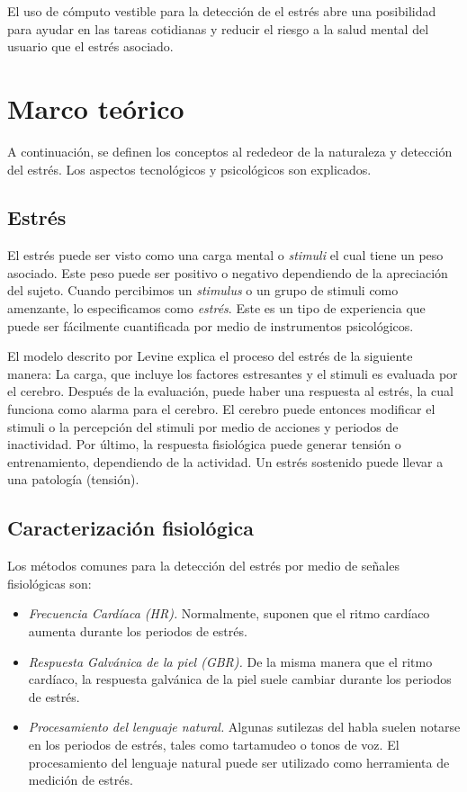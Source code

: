 \documentclass[letterpaper,12pt]{cicese}
\begin{document}
			El uso de c\'omputo vestible para la detecci\'on de el estr\'es abre una posibilidad para ayudar en las tareas cotidianas y reducir el riesgo a la salud mental
			del usuario que el estr\'es asociado.
		\chapter{Marco te\'orico} 
			A continuaci\'on, se definen los conceptos al rededeor de la naturaleza y detecci\'on del estr\'es. Los aspectos tecnol\'ogicos y psicol\'ogicos son explicados.
			\section{Estr\'es}
				El estr\'es puede ser visto como una carga mental o \emph{stimuli} el cual tiene un peso asociado. Este peso puede ser positivo o negativo dependiendo
				de la apreciaci\'on del sujeto. Cuando percibimos un \emph{stimulus} o un grupo de {stimuli} como amenzante, lo especificamos como \emph{estr\'es}\citep{Sebastian2013556}.
				Este es un tipo de experiencia que puede ser f\'acilmente cuantificada por medio de instrumentos psicol\'ogicos.
				
				El modelo descrito por Levine \citep{Sebastian2013556} explica el proceso del estr\'es de la siguiente manera: La carga, que incluye los factores estresantes y el
				stimuli es evaluada por el cerebro. Despu\'es de la evaluaci\'on, puede haber una respuesta al estr\'es, la cual funciona como alarma para el cerebro.
				El cerebro puede entonces modificar el stimuli o la percepci\'on del stimuli por medio de acciones y periodos de inactividad. Por \'ultimo, la respuesta
				fisiol\'ogica puede generar tensi\'on  o entrenamiento, dependiendo de la actividad. Un estr\'es sostenido puede llevar a una patolog\'ia (tensi\'on).
			\section{Caracterizaci\'on fisiol\'ogica}
				Los m\'etodos comunes para la detecci\'on del estr\'es por medio de se\~nales fisiol\'ogicas son: 
					\begin{itemize}
						\item \emph{Frecuencia Card\'iaca (HR).} Normalmente, suponen que el ritmo card\'iaco aumenta durante los periodos de estr\'es. 
						\item \emph{Respuesta Galv\'anica de la piel (GBR).} De la misma manera que el ritmo card\'iaco, la respuesta galv\'anica de la piel suele cambiar durante los periodos de estr\'es.
						\item \emph{Procesamiento del lenguaje natural.} Algunas sutilezas del habla suelen notarse en los periodos de estr\'es, tales como tartamudeo o tonos de voz.
						El procesamiento del lenguaje natural puede ser utilizado como herramienta de medici\'on de estr\'es.
					\end{itemize}
\end{document}
